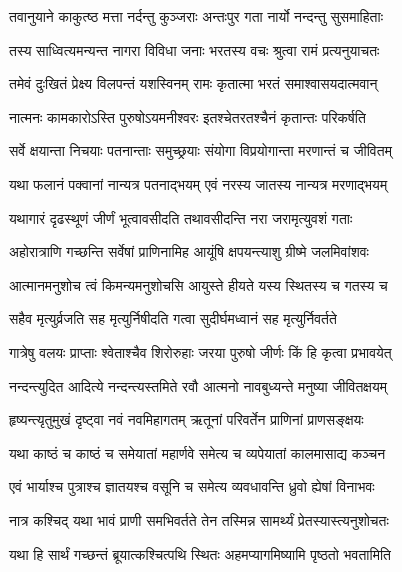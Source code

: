 \twolineshloka
{तवानुयाने काकुत्ष्ठ मत्ता नर्दन्तु कुञ्जराः}
{अन्तःपुर गता नार्यो नन्दन्तु सुसमाहिताः} %

\twolineshloka
{तस्य साध्वित्यमन्यन्त नागरा विविधा जनाः}
{भरतस्य वचः श्रुत्वा रामं प्रत्यनुयाचतः} %

\twolineshloka
{तमेवं दुःखितं प्रेक्ष्य विलपन्तं यशस्विनम्}
{रामः कृतात्मा भरतं समाश्वासयदात्मवान्} %

\twolineshloka
{नात्मनः कामकारोऽस्ति पुरुषोऽयमनीश्वरः}
{इतश्चेतरतश्चैनं कृतान्तः परिकर्षति} %

\twolineshloka
{सर्वे क्षयान्ता निचयाः पतनान्ताः समुच्छ्रयाः}
{संयोगा विप्रयोगान्ता मरणान्तं च जीवितम्} %

\twolineshloka
{यथा फलानं पक्वानां नान्यत्र पतनाद्भयम्}
{एवं नरस्य जातस्य नान्यत्र मरणाद्भयम्} %

\twolineshloka
{यथागारं दृढस्थूणं जीर्णं भूत्वावसीदति}
{तथावसीदन्ति नरा जरामृत्युवशं गताः} %

\twolineshloka
{अहोरात्राणि गच्छन्ति सर्वेषां प्राणिनामिह}
{आयूंषि क्षपयन्त्याशु ग्रीष्मे जलमिवांशवः} %

\twolineshloka
{आत्मानमनुशोच त्वं किमन्यमनुशोचसि}
{आयुस्ते हीयते यस्य स्थितस्य च गतस्य च} %

\twolineshloka
{सहैव मृत्युर्व्रजति सह मृत्युर्निषीदति}
{गत्वा सुदीर्घमध्वानं सह मृत्युर्निवर्तते} %

\twolineshloka
{गात्रेषु वलयः प्राप्ताः श्वेताश्चैव शिरोरुहाः}
{जरया पुरुषो जीर्णः किं हि कृत्वा प्रभावयेत्} %

\twolineshloka
{नन्दन्त्युदित आदित्ये नन्दन्त्यस्तमिते रवौ}
{आत्मनो नावबुध्यन्ते मनुष्या जीवितक्षयम्} %

\twolineshloka
{हृष्यन्त्यृतुमुखं दृष्ट्वा नवं नवमिहागतम्}
{ऋतूनां परिवर्तेन प्राणिनां प्राणसङ्क्षयः} %

\twolineshloka
{यथा काष्ठं च काष्ठं च समेयातां महार्णवे}
{समेत्य च व्यपेयातां कालमासाद्य कञ्चन} %

\twolineshloka
{एवं भार्याश्च पुत्राश्च ज्ञातयश्च वसूनि च}
{समेत्य व्यवधावन्ति ध्रुवो ह्येषां विनाभवः} %

\twolineshloka
{नात्र कश्चिद् यथा भावं प्राणी समभिवर्तते}
{तेन तस्मिन्न सामर्थ्यं प्रेतस्यास्त्यनुशोचतः} %

\twolineshloka
{यथा हि सार्थं गच्छन्तं ब्रूयात्कश्चित्पथि स्थितः}
{अहमप्यागमिष्यामि पृष्ठतो भवतामिति} %

